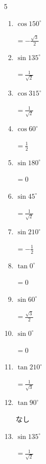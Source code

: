 \begin{multicols}{5}
\begin{enumerate}
        $\displaystyle =1$

  \item $\displaystyle \cos{150^\circ}$

        $\displaystyle =-\frac{\sqrt{3}}{2}$

  \item $\displaystyle \sin{135^\circ}$

        $\displaystyle =\frac{1}{\sqrt{2}}$

  \item $\displaystyle \cos{315^\circ}$

        $\displaystyle =\frac{1}{\sqrt{2}}$

  \item $\displaystyle \cos{60^\circ}$

        $\displaystyle =\frac{1}{2}$

  \item $\displaystyle \sin{180^\circ}$

        $\displaystyle =0$

  \item $\displaystyle \sin{45^\circ}$

        $\displaystyle =\frac{1}{\sqrt{2}}$

  \item $\displaystyle \sin{210^\circ}$

        $\displaystyle =-\frac{1}{2}$

  \item $\displaystyle \tan{0^\circ}$

        $\displaystyle =0$

  \item $\displaystyle \sin{60^\circ}$

        $\displaystyle =\frac{\sqrt{3}}{2}$

  \item $\displaystyle \sin{0^\circ}$

        $\displaystyle =0$

  \item $\displaystyle \tan{210^\circ}$

        $\displaystyle =\frac{1}{\sqrt{3}}$

  \item $\displaystyle \tan{90^\circ}$

        $\displaystyle なし$

  \item $\displaystyle \sin{135^\circ}$

        $\displaystyle =\frac{1}{\sqrt{2}}$


\end{enumerate}
\end{multicols}
